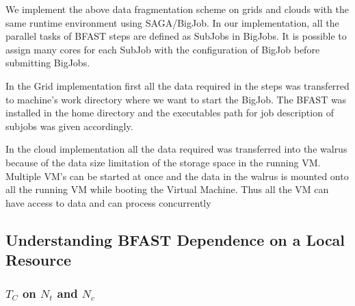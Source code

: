\documentclass{acm_proc_article-sp}
\begin{document}
We implement the above data fragmentation scheme on grids and clouds with the same runtime environment using SAGA/BigJob\cite{saga-royalsoc,saga-ccgrid10, ecmls10}.  In our implementation, all the parallel tasks of BFAST steps are defined as SubJobs in BigJobs.  It is possible to assign many cores for each SubJob with the configuration of BigJob before submitting BigJobs. 
  
In the Grid implementation first all the data required in the steps was transferred to machine's  work 
directory where we want to start the BigJob. The BFAST was installed in the home directory and the
executables path for job description of subjobs was given accordingly.

In the cloud implementation all the data required was transferred into the walrus because of the data size limitation of the storage space in the
running VM. Multiple VM's can be started at once and the data in the walrus is mounted onto all the running VM
while booting the Virtual Machine. Thus all the VM can have access to data and can process concurrently


\subsection{Understanding BFAST Dependence on a Local Resource}

\subsubsection{$T_{C}$ on $N_t$ and $N_c$}
\end{document}
